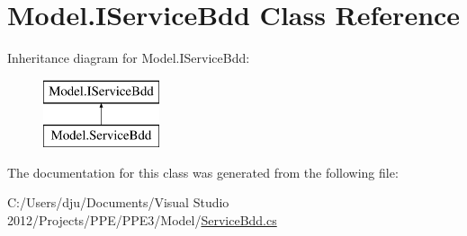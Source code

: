 \hypertarget{class_model_1_1_i_service_bdd}{\section{Model.\-I\-Service\-Bdd Class Reference}
\label{class_model_1_1_i_service_bdd}
}
Inheritance diagram for Model.\-I\-Service\-Bdd\-:\begin{figure}[H]
\begin{center}
\leavevmode
\includegraphics[height=2.000000cm]{class_model_1_1_i_service_bdd}
\end{center}
\end{figure}


The documentation for this class was generated from the following file\-:\begin{DoxyCompactItemize}
\item 
C\-:/\-Users/dju/\-Documents/\-Visual Studio 2012/\-Projects/\-P\-P\-E/\-P\-P\-E3/\-Model/\hyperlink{_service_bdd_8cs}{Service\-Bdd.\-cs}\end{DoxyCompactItemize}
